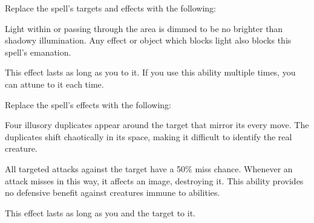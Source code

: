 


Replace the spell's targets and effects with the following:
\begin{spellcontent}

\begin{augmenttargetinginfo}


\end{augmenttargetinginfo}


\begin{augmenteffects}



\spelleffect
Light within or passing through the area is dimmed to be no brighter than shadowy illumination.
Any effect or object which blocks light also blocks this spell's emanation.

This effect lasts as long as you  to it.
If you use this ability multiple times, you can attune to it each time.








\end{augmenteffects}

\end{spellcontent}








Replace the spell's effects with the following:
\begin{spellcontent}

\begin{augmenteffects}



\spelleffect
Four illusory duplicates appear around the target that mirror its every move.
The duplicates shift chaotically in its space, making it difficult to identify the real creature.

All targeted attacks against the target have a 50\% miss chance.
Whenever an attack misses in this way, it affects an image, destroying it.
This ability provides no defensive benefit against creatures immune to  abilities.

This effect lasts as long as you and the target  to it.








\end{augmenteffects}

\end{spellcontent}





